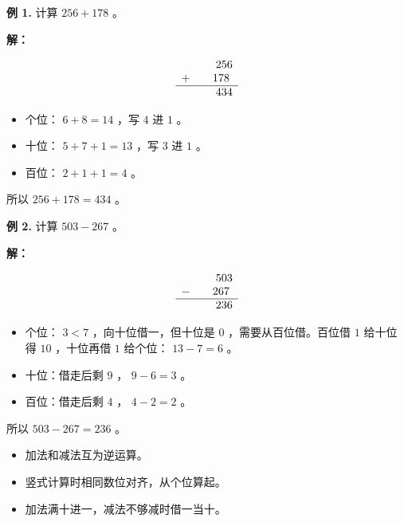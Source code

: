 \begin{workedexamples}


\textbf{例 1.} 计算 $256 + 178$ 。

\textbf{解：}

\[
\begin{array}{rl}
&\phantom{+}256 \\
+\enspace&\phantom{0}178 \\
\hline
&\phantom{+}434
\end{array}
\]


\begin{itemize}
  \item 个位： $6 + 8 = 14$ ，写 $4$ 进 $1$ 。
  \item 十位： $5 + 7 + 1 = 13$ ，写 $3$ 进 $1$ 。
  \item 百位： $2 + 1 + 1 = 4$ 。
\end{itemize}


所以 $256 + 178 = 434$ 。

\textbf{例 2.} 计算 $503 - 267$ 。

\textbf{解：}

\[
\begin{array}{rl}
&\phantom{-}503 \\
-\enspace&\phantom{0}267 \\
\hline
&\phantom{-}236
\end{array}
\]


\begin{itemize}
  \item 个位： $3 < 7$ ，向十位借一，但十位是 $0$ ，需要从百位借。百位借 $1$ 给十位得 $10$ ，十位再借 $1$ 给个位： $13 - 7 = 6$ 。
  \item 十位：借走后剩 $9$ ， $9 - 6 = 3$ 。
  \item 百位：借走后剩 $4$ ， $4 - 2 = 2$ 。
\end{itemize}


所以 $503 - 267 = 236$ 。

\end{workedexamples}

\begin{keytakeaway}


\begin{itemize}
  \item 加法和减法互为逆运算。
  \item 竖式计算时相同数位对齐，从个位算起。
  \item 加法满十进一，减法不够减时借一当十。
\end{itemize}


\end{keytakeaway}


